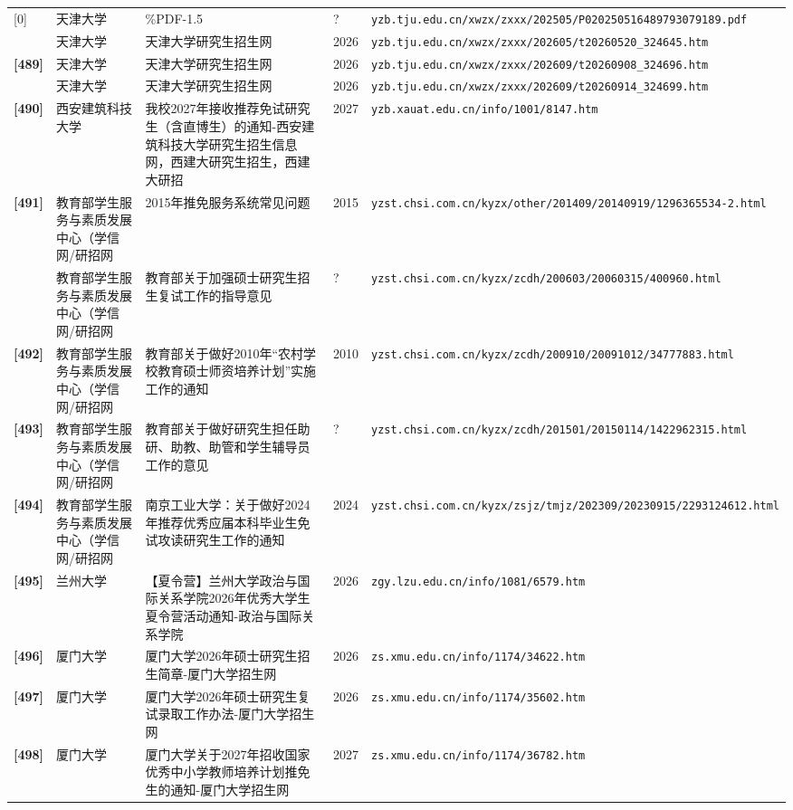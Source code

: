 {\begin{longtable}{@{}p{1.15cm}p{2.9cm}p{6.3cm}p{0.85cm}p{5.0cm}@{}}
[0] & 天津大学 & \%PDF-1.5 & ? & \texttt{yzb.tju.edu.cn/xwzx/zxxx/202505/P020250516489793079189.pdf} \\
[0] & 天津大学 & 天津大学研究生招生网 & 2026 & \texttt{yzb.tju.edu.cn/xwzx/zxxx/202605/t20260520\_324645.htm} \\
\textbf{[489]} & 天津大学 & 天津大学研究生招生网 & 2026 & \texttt{yzb.tju.edu.cn/xwzx/zxxx/202609/t20260908\_324696.htm} \\
[0] & 天津大学 & 天津大学研究生招生网 & 2026 & \texttt{yzb.tju.edu.cn/xwzx/zxxx/202609/t20260914\_324699.htm} \\
\textbf{[490]} & 西安建筑科技大学 & 我校2027年接收推荐免试研究生（含直博生）的通知-西安建筑科技大学研究生招生信息网，西建大研究生招生，西建大研招 & 2027 & \texttt{yzb.xauat.edu.cn/info/1001/8147.htm} \\
\textbf{[491]} & 教育部学生服务与素质发展中心（学信网/研招网 & 2015年推免服务系统常见问题 & 2015 & \texttt{yzst.chsi.com.cn/kyzx/other/201409/20140919/1296365534-2.html} \\
[0] & 教育部学生服务与素质发展中心（学信网/研招网 & 教育部关于加强硕士研究生招生复试工作的指导意见 & ? & \texttt{yzst.chsi.com.cn/kyzx/zcdh/200603/20060315/400960.html} \\
\textbf{[492]} & 教育部学生服务与素质发展中心（学信网/研招网 & 教育部关于做好2010年“农村学校教育硕士师资培养计划”实施工作的通知 & 2010 & \texttt{yzst.chsi.com.cn/kyzx/zcdh/200910/20091012/34777883.html} \\
\textbf{[493]} & 教育部学生服务与素质发展中心（学信网/研招网 & 教育部关于做好研究生担任助研、助教、助管和学生辅导员工作的意见 & ? & \texttt{yzst.chsi.com.cn/kyzx/zcdh/201501/20150114/1422962315.html} \\
\textbf{[494]} & 教育部学生服务与素质发展中心（学信网/研招网 & 南京工业大学：关于做好2024年推荐优秀应届本科毕业生免试攻读研究生工作的通知 & 2024 & \texttt{yzst.chsi.com.cn/kyzx/zsjz/tmjz/202309/20230915/2293124612.html} \\
\textbf{[495]} & 兰州大学 & 【夏令营】兰州大学政治与国际关系学院2026年优秀大学生夏令营活动通知-政治与国际关系学院 & 2026 & \texttt{zgy.lzu.edu.cn/info/1081/6579.htm} \\
\textbf{[496]} & 厦门大学 & 厦门大学2026年硕士研究生招生简章-厦门大学招生网 & 2026 & \texttt{zs.xmu.edu.cn/info/1174/34622.htm} \\
\textbf{[497]} & 厦门大学 & 厦门大学2026年硕士研究生复试录取工作办法-厦门大学招生网 & 2026 & \texttt{zs.xmu.edu.cn/info/1174/35602.htm} \\
\textbf{[498]} & 厦门大学 & 厦门大学关于2027年招收国家优秀中小学教师培养计划推免生的通知-厦门大学招生网 & 2027 & \texttt{zs.xmu.edu.cn/info/1174/36782.htm} \\

\end{longtable}}
